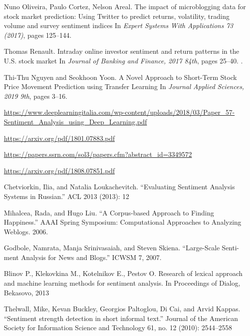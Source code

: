 \documentclass{article}
\begin{document}
\newpage
  


\begin{thebibliography}{1}

Nuno Oliveira, Paulo Cortez, Nelson Areal.
\newblock The impact of microblogging data for stock market prediction: Using
Twitter to predict returns, volatility, trading volume and survey
sentiment indices
\newblock In {\em Expert Systems With Applications 73 (2017)}, pages 125--144.

Thomas Renault.
\newblock Intraday online investor sentiment and return patterns in the U.S.
stock market
\newblock In {\em Journal of Banking and Finance, 2017 84th}, pages 25--40. .

Thi-Thu Nguyen and Seokhoon Yoon.
\newblock A Novel Approach to Short-Term Stock Price
Movement Prediction using Transfer Learning
\newblock In {\em Journal Applied Sciences, 2019 9th}, pages 3--16.

 \url{https://www.deeplearningitalia.com/wp-content/uploads/2018/03/Paper_57-Sentiment_Analysis_using_Deep_Learning.pdf}

\url{https://arxiv.org/pdf/1801.07883.pdf}

\url{https://papers.ssrn.com/sol3/papers.cfm?abstract_id=3349572}

\url{https://arxiv.org/pdf/1808.07851.pdf}

\newblock Chetviorkin, Ilia, and Natalia Loukachevitch. “Evaluating Sentiment Analysis
Systems in Russian.” ACL 2013 (2013): 12

\newblock Mihalcea, Rada, and Hugo Liu. “A Corpus-based Approach to Finding Happiness.”
AAAI Spring Symposium: Computational Approaches to Analyzing Weblogs. 2006.

\newblock Godbole, Namrata, Manja Srinivasaiah, and Steven Skiena. “Large-Scale Senti- ment Analysis for News and Blogs.” ICWSM 7, 2007.

\newblock Blinov P., Klekovkina M., Kotelnikov E., Pestov O. Research of lexical approach and machine learning methods for sentiment analysis. In Proceedings of Dialog,
Bekasovo, 2013

\newblock Thelwall, Mike, Kevan Buckley, Georgios Paltoglou, Di Cai, and Arvid Kappas.
“Sentiment strength detection in short informal text.” Journal of the American
Society for Information Science and Technology 61, no. 12 (2010): 2544–2558


\end{thebibliography}
\end{document}
